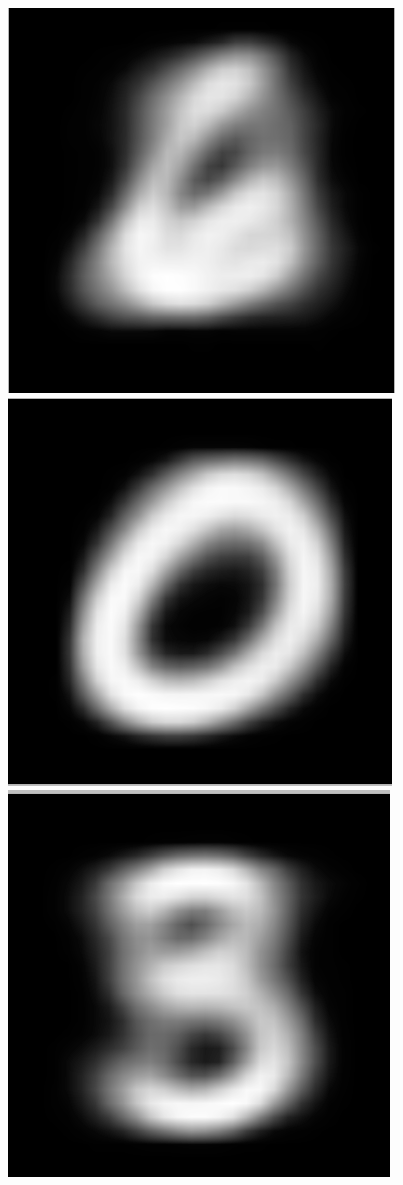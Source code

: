 \documentclass[submit]{harvardml}
\begin{document}
\begin{figure}[h]
	\includegraphics[scale=0.1]{./m1/3}
	\includegraphics[scale=0.1]{./m1/4}
	\includegraphics[scale=0.1]{./m1/5}

\end{figure}
\end{document}
